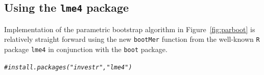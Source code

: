 \documentclass{article}\usepackage[]{graphicx}\usepackage[]{color}
\makeatletter
\newcommand{\hlcom}[1]{\textcolor[rgb]{0.678,0.584,0.686}{\textit{#1}}}%
\newenvironment{kframe}{%
 \def\at@end@of@kframe{}%
 \ifinner\ifhmode%
  \def\at@end@of@kframe{\end{minipage}}%
  \begin{minipage}{\columnwidth}%
 \fi\fi%
 \def\FrameCommand##1{\hskip\@totalleftmargin \hskip-\fboxsep
 \colorbox{shadecolor}{##1}\hskip-\fboxsep
     \hskip-\linewidth \hskip-\@totalleftmargin \hskip\columnwidth}%
 \MakeFramed {\advance\hsize-\width
   \@totalleftmargin\z@ \linewidth\hsize
   \@setminipage}}%
 {\par\unskip\endMakeFramed%
 \at@end@of@kframe}
\newenvironment{knitrout}{}{} %
\makeatother
\begin{document}
\begin{knitrout}
\color{fgcolor}\begin{kframe}


{\ttfamily\noindent\bfseries{}}\end{kframe}
\end{knitrout}

\subsection[Using the lme4 package]{Using the \texttt{lme4} package}
\label{sec:lme4}
Implementation of the parametric bootstrap algorithm in Figure~\ref{fig:parboot} is relatively straight forward using the new \texttt{bootMer} function from the well-known \texttt{R} package \texttt{lme4} \citep{bates-lme4-2014} in conjunction with the \texttt{boot} package.

\begin{knitrout}
\color{fgcolor}\begin{kframe}
\begin{alltt}
\hlcom{# install.packages("investr", "lme4")}
\end{alltt}
\end{kframe}
\end{knitrout}
\end{document}
